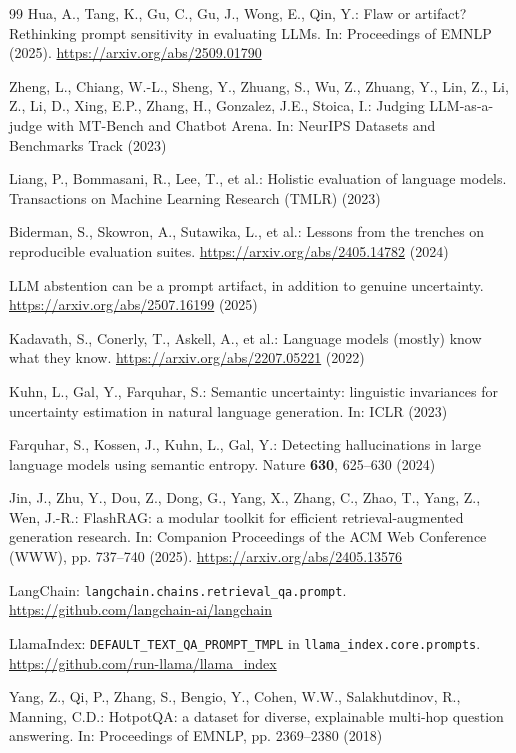 ﻿\documentclass[11pt]{article}
\begin{document}
\begin{thebibliography}{99}
Hua, A., Tang, K., Gu, C., Gu, J., Wong, E., Qin, Y.: Flaw or artifact? Rethinking prompt
sensitivity in evaluating LLMs. In: Proceedings of EMNLP (2025).
\url{https://arxiv.org/abs/2509.01790}

Zheng, L., Chiang, W.-L., Sheng, Y., Zhuang, S., Wu, Z., Zhuang, Y., Lin, Z., Li, Z., Li, D.,
Xing, E.P., Zhang, H., Gonzalez, J.E., Stoica, I.: Judging LLM-as-a-judge with MT-Bench and
Chatbot Arena. In: NeurIPS Datasets and Benchmarks Track (2023)

Liang, P., Bommasani, R., Lee, T., et al.: Holistic evaluation of language models. Transactions
on Machine Learning Research (TMLR) (2023)

Biderman, S., Skowron, A., Sutawika, L., et al.: Lessons from the trenches on reproducible
evaluation suites. \url{https://arxiv.org/abs/2405.14782} (2024)

LLM abstention can be a prompt artifact, in addition to genuine uncertainty.
\url{https://arxiv.org/abs/2507.16199} (2025)

Kadavath, S., Conerly, T., Askell, A., et al.: Language models (mostly) know what they know.
\url{https://arxiv.org/abs/2207.05221} (2022)

Kuhn, L., Gal, Y., Farquhar, S.: Semantic uncertainty: linguistic invariances for uncertainty
estimation in natural language generation. In: ICLR (2023)

Farquhar, S., Kossen, J., Kuhn, L., Gal, Y.: Detecting hallucinations in large language models
using semantic entropy. Nature \textbf{630}, 625--630 (2024)

Jin, J., Zhu, Y., Dou, Z., Dong, G., Yang, X., Zhang, C., Zhao, T., Yang, Z., Wen, J.-R.:
FlashRAG: a modular toolkit for efficient retrieval-augmented generation research. In:
Companion Proceedings of the ACM Web Conference (WWW), pp. 737--740 (2025).
\url{https://arxiv.org/abs/2405.13576}

LangChain: \texttt{langchain.chains.retrieval\_qa.prompt}.
\url{https://github.com/langchain-ai/langchain}

LlamaIndex: \texttt{DEFAULT\_TEXT\_QA\_PROMPT\_TMPL} in \texttt{llama\_index.core.prompts}.
\url{https://github.com/run-llama/llama_index}

Yang, Z., Qi, P., Zhang, S., Bengio, Y., Cohen, W.W., Salakhutdinov, R., Manning, C.D.:
HotpotQA: a dataset for diverse, explainable multi-hop question answering. In: Proceedings of
EMNLP, pp. 2369--2380 (2018)


\end{thebibliography}
\end{document}
